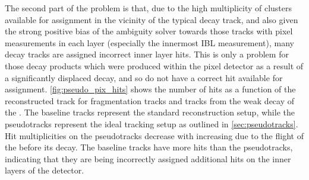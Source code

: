 
The second part of the problem is that, due to the high multiplicity of clusters available for assignment in the vicinity of the typical \highpt \bhadron decay track, and also given the strong positive bias of the ambiguity solver towards those tracks with pixel measurements in each layer (especially the innermost IBL measurement), many \bhadron decay tracks are assigned incorrect inner layer hits.
This is only a problem for those decay products which were produced within the pixel detector as a result of a significantly displaced \bhadron decay, and so do not have a correct hit available for assignment.
\cref{fig:pseudo_pix_hits} shows the number of hits as a function of the reconstructed track \pt for fragmentation tracks and tracks from the weak decay of the \bhadron.
The baseline tracks represent the standard reconstruction setup, while the pseudotracks represent the ideal tracking setup as outlined in \cref{sec:pseudotracks}.
Hit multiplicities on the pseudotracks decrease with increasing \pt due to the flight of the \bhadron before its decay. 
The baseline tracks have more hits than the pseudotracks, indicating that they are being incorrectly assigned additional hits on the inner layers of the detector.

